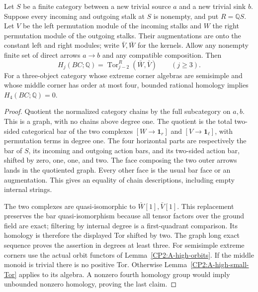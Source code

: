 \begin{lemma}
\label{CP2:A-high-linear-Tor}
Let $S$ be a finite category between a new trivial source $a$
and a new trivial sink $b$.  Suppose every incoming and
outgoing stalk at $S$ is nonempty, and put $R=\mathbb QS$.
Let $V$ be the left permutation module of the incoming
stalks and $W$ the right permutation module of the outgoing
stalks.  Their augmentations are onto the constant left
and right modules; write $\bar V,\bar W$ for the kernels.
Allow any nonempty finite set of direct arrows $a\to b$
and any compatible composition.  Then
\[
 H_j(BC;\mathbb Q)=\operatorname{Tor}_{j-2}^R(\bar W,\bar V)
 \qquad(j\geq3).
\]
For a three-object category whose extreme corner algebras
are semisimple and whose middle corner has order at most
four, bounded rational homology implies $H_4(BC;\mathbb Q)=0$.
\end{lemma}
\begin{proof}
Quotient the normalized category chains by the full subcategory
on $a,b$.  This is a graph, with no chains above degree one.
The quotient is the total two-sided categorical bar of the
two complexes $[W\to\mathbf1_r]$ and
$[V\to\mathbf1_\ell]$, with permutation terms in degree
one.  The four horizontal parts are respectively the bar
of $S$, its incoming and outgoing action bars, and its
two-sided action bar, shifted by zero, one, one, and two.
The face composing the two outer arrows lands in the
quotiented graph.  Every other face is the usual bar
face or an augmentation.  This gives an equality of
chain descriptions, including empty internal strings.

The two complexes are quasi-isomorphic to
$\bar W[1],\bar V[1]$.  This replacement preserves the
bar quasi-isomorphism because all tensor factors over
the ground field are exact; filtering by internal degree
is a first-quadrant comparison.  Its homology is therefore
the displayed Tor shifted by two.  The graph long exact
sequence proves the assertion in degrees at least three.
For semisimple extreme corners use the actual orbit
functors of Lemma~\ref{CP2:A-high-orbits}.  If the middle
monoid is trivial there is no positive Tor.  Otherwise
Lemma~\ref{CP2:A-high-small-Tor} applies to its algebra.
A nonzero fourth homology group would imply unbounded
nonzero homology, proving the last claim.
\end{proof}
